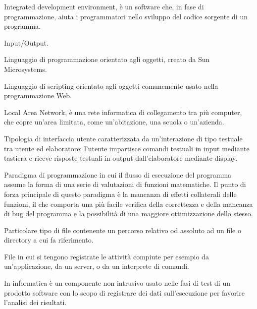 
\begin{itemize}


Integrated development environment,  è un software che, in fase di programmazione, aiuta i programmatori nello sviluppo del codice sorgente di un programma.


Input/Output.

\end{itemize}


\begin{itemize}


Linguaggio di programmazione orientato agli oggetti, creato da Sun Microsystems.


Linguaggio di scripting orientato agli oggetti comunemente usato nella programmazione Web.

\end{itemize}


\begin{itemize}


Local Area Network, è una rete informatica di collegamento tra più computer, che copre un'area limitata, come un'abitazione, una scuola o un'azienda.


Tipologia di interfaccia utente caratterizzata da un'interazione di tipo testuale tra utente ed elaboratore: l'utente impartisce comandi testuali in input mediante tastiera e riceve risposte testuali in output dall'elaboratore mediante display.


Paradigma di programmazione in cui il flusso di esecuzione del programma assume la forma di una serie di valutazioni di funzioni matematiche. Il punto di forza principale di questo paradigma è la mancanza di effetti collaterali delle funzioni, il che comporta una più facile verifica della correttezza e della mancanza di bug del programma e la possibilità di una maggiore ottimizzazione dello stesso.


Particolare tipo di file contenente un percorso relativo od assoluto ad un file o directory a cui fa riferimento.


File in cui si tengono registrate le attività compiute per esempio da un'applicazione, da un server, o da un interprete di comandi.


In informatica è un componente non intrusivo usato nelle fasi di test di un prodotto software con lo scopo di registrare dei dati sull'esecuzione per favorire l'analisi dei risultati.

\end{itemize}

